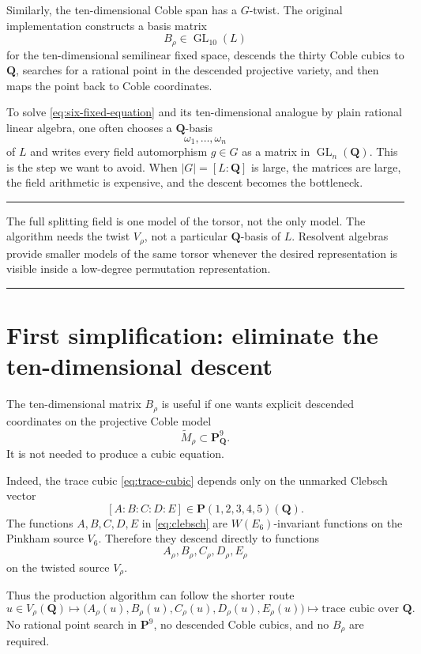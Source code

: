 \documentclass[11pt]{article}
\newcommand{\QQ}{\mathbf{Q}}
\newcommand{\PP}{\mathbf{P}}
\newcommand{\tM}{\widetilde{M}}
\newcommand{\V}{V_6}
\newenvironment{summarybox}{%
  \begin{center}\begin{minipage}{0.94\textwidth}\small
  \hrule\vspace{0.55em}%
}{%
  \vspace{0.55em}\hrule\end{minipage}\end{center}%
}
\begin{document}
Similarly, the ten-dimensional Coble span has a $G$-twist.  The original
implementation constructs a basis matrix
\[
  B_\rho\in\operatorname{GL}_{10}(L)
\]
for the ten-dimensional semilinear fixed space, descends the thirty Coble cubics
to $\QQ$, searches for a rational point in the descended projective variety, and
then maps the point back to Coble coordinates.

To solve \eqref{eq:six-fixed-equation} and its ten-dimensional analogue by plain
rational linear algebra, one often chooses a $\QQ$-basis
\[
  \omega_1,\ldots,\omega_n
\]
of $L$ and writes every field automorphism $g\in G$ as a matrix in
$\operatorname{GL}_n(\QQ)$.  This is the step we want to avoid.  When
$|G|=[L:\QQ]$ is large, the matrices are large, the field arithmetic is expensive,
and the descent becomes the bottleneck.

\begin{summarybox}
The full splitting field is one model of the torsor, not the only model.  The
algorithm needs the twist
$V_\rho$, not a particular $\QQ$-basis of $L$.  Resolvent algebras provide smaller
models of the same torsor whenever the desired representation is visible inside a
low-degree permutation representation.
\end{summarybox}

\section{First simplification: eliminate the ten-dimensional descent}

The ten-dimensional matrix $B_\rho$ is useful if one wants explicit descended
coordinates on the projective Coble model
\[
  \tM_\rho\subset\PP^9_\QQ.
\]
It is not needed to produce a cubic equation.

Indeed, the trace cubic \eqref{eq:trace-cubic} depends only on the unmarked
Clebsch vector
\[
  [A:B:C:D:E]\in \PP(1,2,3,4,5)(\QQ).
\]
The functions $A,B,C,D,E$ in \eqref{eq:clebsch} are $W(E_6)$-invariant functions
on the Pinkham source $\V$.  Therefore they descend directly to functions
\[
  A_\rho,B_\rho,C_\rho,D_\rho,E_\rho
\]
on the twisted source $V_\rho$.

Thus the production algorithm can follow the shorter route
\[
  u\in V_\rho(\QQ)
  \longmapsto
  \bigl(A_\rho(u),B_\rho(u),C_\rho(u),D_\rho(u),E_\rho(u)\bigr)
  \longmapsto
  \text{trace cubic over }\QQ.
\]
No rational point search in $\PP^9$, no descended Coble cubics, and no
$B_\rho$ are required.
\end{document}
